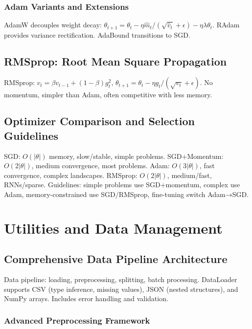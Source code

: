 \documentclass[11pt,a4paper]{report}
\begin{document}
\subsubsection{Adam Variants and Extensions}

AdamW decouples weight decay: $\theta_{t+1} = \theta_t - \eta \hat{m}_t/(\sqrt{\hat{v}_t} + \epsilon) - \eta \lambda \theta_t$. RAdam provides variance rectification. AdaBound transitions to SGD.

\subsection{RMSprop: Root Mean Square Propagation}

RMSprop: $v_t = \beta v_{t-1} + (1 - \beta) g_t^2$, $\theta_{t+1} = \theta_t - \eta g_t/(\sqrt{v_t} + \epsilon)$. No momentum, simpler than Adam, often competitive with less memory.

\subsection{Optimizer Comparison and Selection Guidelines}

SGD: $O(|\theta|)$ memory, slow/stable, simple problems. SGD+Momentum: $O(2|\theta|)$, medium convergence, most problems. Adam: $O(3|\theta|)$, fast convergence, complex landscapes. RMSprop: $O(2|\theta|)$, medium/fast, RNNs/sparse. Guidelines: simple problems use SGD+momentum, complex use Adam, memory-constrained use SGD/RMSprop, fine-tuning switch Adam→SGD.

\section{Utilities and Data Management}

\subsection{Comprehensive Data Pipeline Architecture}

Data pipeline: loading, preprocessing, splitting, batch processing. DataLoader supports CSV (type inference, missing values), JSON (nested structures), and NumPy arrays. Includes error handling and validation.

\subsubsection{Advanced Preprocessing Framework}
\end{document}
